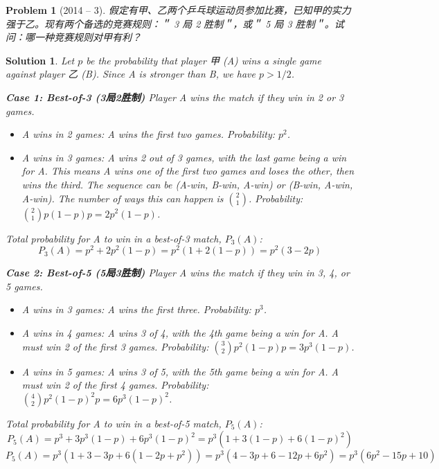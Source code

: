 \documentclass[12pt]{amsart}
\newtheorem{problem}{Problem}
\newtheorem*{solution}{Solution}
\begin{document}
\begin{problem}[2014 -- 3]
假定有甲、乙两个乒乓球运动员参加比赛，已知甲的实力强于乙。现有两个备选的竞赛规则：＂ 3 局 2 胜制＂，或＂ 5 局 3 胜制＂。试问：哪一种竞赛规则对甲有利？
\end{problem}
\begin{solution}
Let $p$ be the probability that player 甲 (A) wins a single game against player 乙 (B). Since A is stronger than B, we have $p > 1/2$.

\textbf{Case 1: Best-of-3 (3局2胜制)}
Player A wins the match if they win in 2 or 3 games.
\begin{itemize}
    \item A wins in 2 games: A wins the first two games. Probability: $p^2$.
    \item A wins in 3 games: A wins 2 out of 3 games, with the last game being a win for A. This means A wins one of the first two games and loses the other, then wins the third. The sequence can be (A-win, B-win, A-win) or (B-win, A-win, A-win).
    The number of ways this can happen is $\binom{2}{1}$.
    Probability: $\binom{2}{1}p(1-p)p = 2p^2(1-p)$.
\end{itemize}
Total probability for A to win in a best-of-3 match, $P_3(A)$:
$$ P_3(A) = p^2 + 2p^2(1-p) = p^2(1 + 2(1-p)) = p^2(3-2p) $$

\textbf{Case 2: Best-of-5 (5局3胜制)}
Player A wins the match if they win in 3, 4, or 5 games.
\begin{itemize}
    \item A wins in 3 games: A wins the first three. Probability: $p^3$.
    \item A wins in 4 games: A wins 3 of 4, with the 4th game being a win for A. A must win 2 of the first 3 games. Probability: $\binom{3}{2}p^2(1-p)p = 3p^3(1-p)$.
    \item A wins in 5 games: A wins 3 of 5, with the 5th game being a win for A. A must win 2 of the first 4 games. Probability: $\binom{4}{2}p^2(1-p)^2p = 6p^3(1-p)^2$.
\end{itemize}
Total probability for A to win in a best-of-5 match, $P_5(A)$:
$$ P_5(A) = p^3 + 3p^3(1-p) + 6p^3(1-p)^2 = p^3(1 + 3(1-p) + 6(1-p)^2) $$
$$ P_5(A) = p^3(1 + 3 - 3p + 6(1-2p+p^2)) = p^3(4 - 3p + 6 - 12p + 6p^2) = p^3(6p^2 - 15p + 10) $$


\end{solution}
\end{document}
